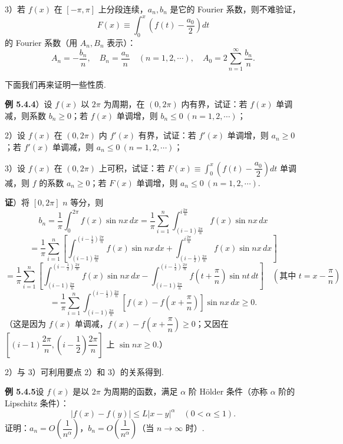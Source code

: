 \documentclass[UTF8,12pt,a4paper,fontset=fandol]{ctexart}
\begin{document}
3）若 $f(x)$ 在 $[-\pi,\pi]$ 上分段连续，$a_n,b_n$ 是它的 Fourier 系数，则不难验证，
\[
  F(x)\equiv\int_0^x\left(f(t)-\frac{a_0}2\right)dt
\]
的 Fourier 系数（用 $A_n,B_n$ 表示）：
\[
  A_n=-\frac{b_n}{n},\quad B_n=\frac{a_n}{n}\quad(n=1,2,\cdots),\quad
  A_0=2\sum_{n=1}^{\infty}\frac{b_n}{n}.
\]

下面我们再来证明一些性质.

\noindent\textbf{例 5.4.4}）设 $f(x)$ 以 $2\pi$ 为周期，在 $(0,2\pi)$ 内有界，试证：若 $f(x)$ 单调减，则系数 $b_n\ge0$；若 $f(x)$ 单调增，则 $b_n\le0\ (n=1,2,\cdots)$；

2）设 $f(x)$ 在 $(0,2\pi)$ 内 $f'(x)$ 有界，试证：若 $f'(x)$ 单调增，则 $a_n\ge0$；若 $f'(x)$ 单调减，则 $a_n\le0\ (n=1,2,\cdots)$；

3）设 $f(x)$ 在 $(0,2\pi)$ 上可积，试证：若 $F(x)\equiv\displaystyle\int_0^x\left(f(t)-\dfrac{a_0}2\right)dt$ 单调减，则 $f$ 的系数 $a_n\ge0$；若 $F(x)$ 单调增，则 $a_n\le0\ (n=1,2,\cdots)$.

\noindent\textbf{证}）将 $[0,2\pi]$ $n$ 等分，则
\[
  b_n=\frac1\pi\int_0^{2\pi}f(x)\sin nx\,dx
  =\frac1\pi\sum_{i=1}^n\int_{(i-1)\frac{2\pi}n}^{i\frac{2\pi}n}f(x)\sin nx\,dx
\]
\[
  =\frac1\pi\sum_{i=1}^n\left[
  \int_{(i-1)\frac{2\pi}n}^{(i-\frac12)\frac{2\pi}n}f(x)\sin nx\,dx
  +\int_{(i-\frac12)\frac{2\pi}n}^{i\frac{2\pi}n}f(x)\sin nx\,dx\right]
\]
\[
  =\frac1\pi\sum_{i=1}^n\left[
  \int_{(i-1)\frac{2\pi}n}^{(i-\frac12)\frac{2\pi}n}f(x)\sin nx\,dx
  -\int_{(i-1)\frac{2\pi}n}^{(i-\frac12)\frac{2\pi}n}f\left(t+\frac\pi n\right)\sin nt\,dt\right]\quad\left(\text{其中 }t=x-\frac\pi n\right)
\]
\[
  =\frac1\pi\sum_{i=1}^n
  \int_{(i-1)\frac{2\pi}n}^{(i-\frac12)\frac{2\pi}n}
  \left[f(x)-f\left(x+\frac\pi n\right)\right]\sin nx\,dx\ge0.
\]
（这是因为 $f(x)$ 单调减，$f(x)-f\left(x+\dfrac\pi n\right)\ge0$；又因在
$\left[(i-1)\dfrac{2\pi}n,\left(i-\dfrac12\right)\dfrac{2\pi}n\right]$ 上 $\sin nx\ge0$.）

2）与 3）可利用要点 2）和 3）的关系得到.

\noindent\textbf{例 5.4.5}\quad 设 $f(x)$ 是以 $2\pi$ 为周期的函数，满足 $\alpha$ 阶 H\"older 条件（亦称 $\alpha$ 阶的 Lipschitz 条件）：
\[
  |f(x)-f(y)|\le L|x-y|^{\alpha}\quad(0<\alpha\le1).
\]
证明：$a_n=O\left(\dfrac1{n^{\alpha}}\right)$，$b_n=O\left(\dfrac1{n^{\alpha}}\right)$（当 $n\to\infty$ 时）.
\end{document}
